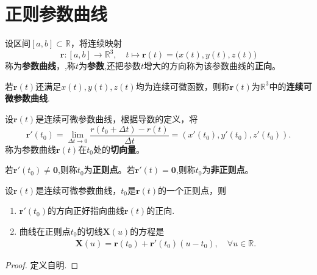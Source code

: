 \documentclass[../../main.tex]{subfiles}%
\begin{document}
\section{正则参数曲线}

\begin{definition}[参数曲线]
设区间$[a,b]\subset \mathbb{R}$，将连续映射
\[
\bm{r}: [a,b] \to \mathbb{R}^3,\quad t\mapsto \bm{r}(t)=\big(x(t),y(t),z(t)\big)
\]
称为\textbf{参数曲线}，,称$t$为\textbf{参数},还把参数$t$增大的方向称为该参数曲线的\textbf{正向}。

若$\bm{r}(t)$还满足$x(t),y(t),z(t)$均为连续可微函数，则称$\bm{r}(t)$为$\mathbb{R}^3$中的\textbf{连续可微参数曲线}.
\end{definition}

\begin{definition}[切向量与正则点]
设$\bm{r}(t)$是连续可微参数曲线，根据导数的定义，将
\[
\bm{r}'(t_0) =\lim_{\Delta t\rightarrow 0} \frac{r\left( t_0+\Delta t \right) -r\left( t \right)}{\Delta t} = \left(x'(t_0),y'(t_0),z'(t_0)\right).
\]
称为参数曲线$\bm{r}(t)$在$t_0$处的\textbf{切向量}。

若$\bm{r}'(t_0)\neq \bm{0}$,则称$t_0$为\textbf{正则点}。若$\bm{r}'(t)=\bm{0}$,则称$t_0$为\textbf{非正则点}。

\end{definition}

\begin{proposition}
设$\bm{r}(t)$是连续可微参数曲线，$t_0$是$\bm{r}(t)$的一个正则点，则
\begin{enumerate}[(1)]
\item $\bm{r}'(t_0)$的方向正好指向曲线$\bm{r}(t)$的正向.

\item 曲线在正则点$t_0$的切线$\boldsymbol{X}\left( u \right)$的方程是
\begin{align*}
\boldsymbol{X}\left( u \right) =\bm{r}\left( t_0 \right) +\bm{r}'\left( t_0 \right)(u-t_0) ,\quad \forall u\in \mathbb{R} .
\end{align*}
\end{enumerate}
\end{proposition}
\begin{proof}
定义自明.
\end{proof}
\end{document}
